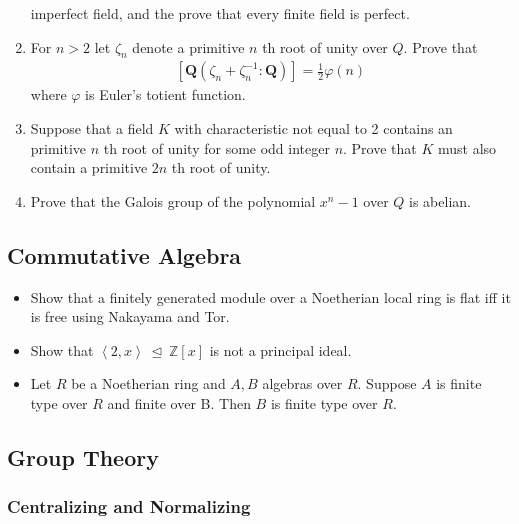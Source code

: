 \begin{enumerate}
  imperfect field, and the prove that every finite field is perfect.
\item
  For \(n>2\) let \(\zeta_{n}\) denote a primitive \(n\) th root of
  unity over \(Q\). Prove that
  \begin{align*}
  \left[\boldsymbol{Q}\left(\zeta_{n}+\zeta_{n}^{-1}: \boldsymbol{Q}\right)\right]=\frac{1}{2} \varphi(n)
  \end{align*}
  where \(\varphi\) is Euler's totient function.
\item
  Suppose that a field \(K\) with characteristic not equal to 2 contains
  an primitive \(n\) th root of unity for some odd integer \(n\). Prove
  that \(K\) must also contain a primitive \(2 n\) th root of unity.
\item
  Prove that the Galois group of the polynomial \(x^{n}-1\) over \(Q\)
  is abelian.
\end{enumerate}

\hypertarget{commutative-algebra-1}{%
\subsection{Commutative Algebra}\label{commutative-algebra-1}}

\begin{itemize}
\item
  Show that a finitely generated module over a Noetherian local ring is
  flat iff it is free using Nakayama and Tor.
\item
  Show that
  \(\left\langle{ 2, x }\right\rangle{~\trianglelefteq~}{\mathbb{Z}}[x]\)
  is not a principal ideal.
\item
  Let \(R\) be a Noetherian ring and \(A,B\) algebras over \(R\).
  Suppose \(A\) is finite type over \(R\) and finite over B. Then \(B\)
  is finite type over \(R\).
\end{itemize}

\hypertarget{group-theory}{%
\subsection{Group Theory}\label{group-theory}}

\hypertarget{centralizing-and-normalizing}{%
\subsubsection{Centralizing and
Normalizing}\label{centralizing-and-normalizing}}

